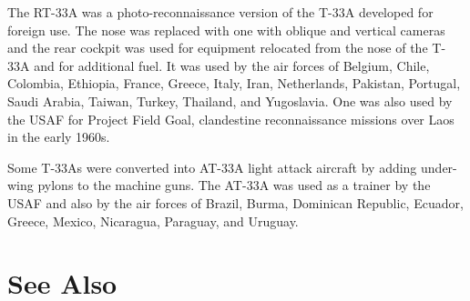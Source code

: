 The RT-33A was a photo-reconnaissance version of the T-33A developed for foreign use. The nose was replaced with one with oblique and vertical cameras and the rear cockpit was used for equipment relocated from the nose of the T-33A and for additional fuel. It was used by the air forces of Belgium, Chile, Colombia, Ethiopia, France, Greece, Italy, Iran, Netherlands, Pakistan, Portugal, Saudi Arabia, Taiwan, Turkey, Thailand, and Yugoslavia. One was also used by the USAF for Project Field Goal, clandestine reconnaissance missions over Laos in the early 1960s.

Some T-33As were converted into AT-33A light attack aircraft by adding under-wing pylons to the machine guns. The AT-33A was used as a trainer by the USAF and also by the air forces of Brazil, Burma, Dominican Republic, Ecuador, Greece, Mexico, Nicaragua, Paraguay, and Uruguay.

\begin{adclist}
\end{adclist}

\section{See Also}
\begin{typelist}
\end{typelist}